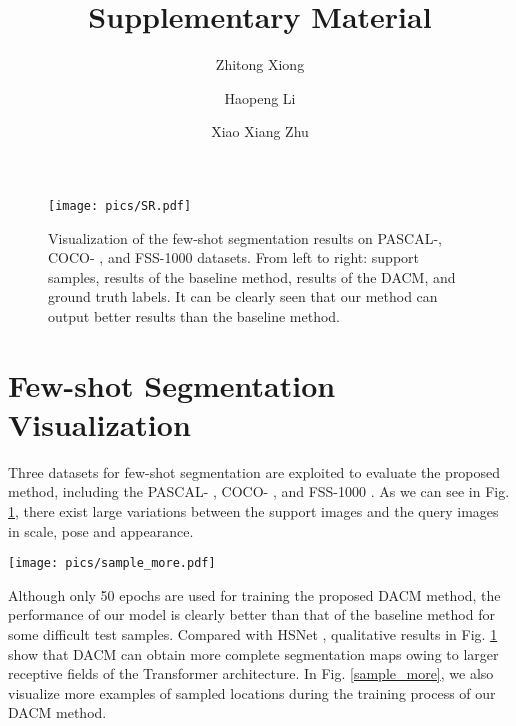 \documentclass[runningheads]{llncs}
\begin{document}
\title{Supplementary Material}
\author{Zhitong Xiong   \and
Haopeng Li   \and
Xiao Xiang Zhu  }
\maketitle
\begin{figure} [!]
	\centering
	\texttt{[image: pics/SR.pdf]}
	\caption{Visualization of the few-shot segmentation results on PASCAL-, COCO- \cite{lin2014microsoft}, and FSS-1000 \cite{li2020fss} datasets. From left to right: support samples, results of the baseline method, results of the DACM, and ground truth labels. It can be clearly seen that our method can output better results than the baseline method. 
}\label{GP3}
\end{figure}
\section{Few-shot Segmentation Visualization}
Three datasets for few-shot segmentation are exploited to evaluate the proposed method, including the PASCAL- \cite{shaban2017one}, COCO- \cite{lin2014microsoft}, and FSS-1000 \cite{li2020fss}. 
As we can see in Fig. \ref{GP3}, there exist large variations between the support images and the query images in scale, pose and appearance.


\begin{figure*}[t]
	\centering
	\texttt{[image: pics/sample\_more.pdf]}
	\caption{Visualization of some qualitative examples of the proposed hard example-aware sampling strategy for training GP models of the DACM model.
}
	\label{sample_more}
\end{figure*} 
Although only 50 epochs are used for training the proposed DACM method, the performance of our model is clearly better than that of the baseline method for some difficult test samples. Compared with HSNet \cite{min2021hypercorrelation}, qualitative results in Fig. \ref{GP3} show that DACM can obtain more complete segmentation maps owing to larger receptive fields of the Transformer architecture. In Fig. \ref{sample_more}, we also visualize more examples of sampled locations during the training process of our DACM method.
\end{document}
